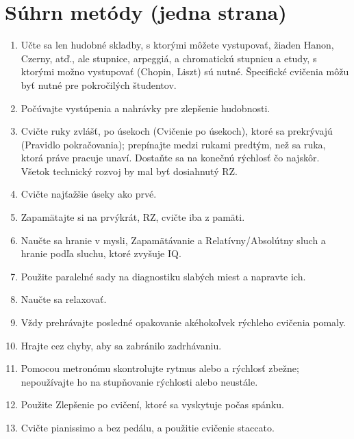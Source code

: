 \documentclass[11pt,a4paper]{book}
\begin{document}
\section{Súhrn metódy (jedna strana)}\label{s:summary-method}
\begin{enumerate}
\item Učte sa len hudobné skladby, s ktorými môžete vystupovať, žiaden Hanon, Czerny, atď., ale stupnice, arpeggiá, a chromatickú stupnicu a etudy, s ktorými možno vystupovať (Chopin, Liszt) sú nutné. Špecifické cvičenia môžu byť nutné pre pokročilých študentov.

\item Počúvajte vystúpenia a nahrávky pre zlepšenie hudobnosti.

\item Cvičte ruky zvlášť, po úsekoch (Cvičenie po úsekoch), ktoré sa prekrývajú (Pravidlo pokračovania); prepínajte medzi rukami predtým, než sa ruka, ktorá práve pracuje unaví. Dostaňte sa na konečnú rýchlosť čo najskôr. Všetok technický rozvoj by mal byť dosiahnutý RZ.

\item Cvičte najťažšie úseky ako prvé.

\item Zapamätajte si na prvýkrát, RZ, cvičte iba z pamäti.

\item Naučte sa hranie v mysli, Zapamätávanie a Relatívny/Absolútny sluch a hranie podľa sluchu, ktoré zvyšuje IQ.

\item Použite paralelné sady na diagnostiku slabých miest a napravte ich.

\item Naučte sa relaxovať.

\item Vždy prehrávajte posledné opakovanie akéhokoľvek rýchleho cvičenia pomaly.

\item Hrajte cez chyby, aby sa zabránilo zadrhávaniu.

\item Pomocou metronómu skontrolujte rytmus alebo a rýchlosť zbežne; nepoužívajte ho na stupňovanie rýchlosti alebo neustále.

\item Použite Zlepšenie po cvičení, ktoré sa vyskytuje počas spánku. 

\item Cvičte pianissimo a bez pedálu, a použitie cvičenie staccato.


\end{enumerate}
\end{document}
